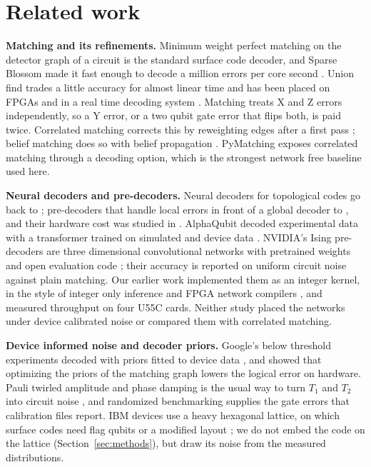 \section{Related work}\label{sec:related}

\textbf{Matching and its refinements.} Minimum weight perfect matching on the detector graph of a circuit
\cite{dennis2002topological,fowler2012surface} is the standard surface code decoder, and Sparse Blossom made it fast
enough to decode a million errors per core second \cite{higgott2025sparse}. Union find trades a little accuracy for
almost linear time \cite{delfosse2021unionfind} and has been placed on FPGAs \cite{liyanage2023fpga} and in a real time
decoding system \cite{barber2025decoder}. Matching treats X and Z errors independently, so a Y error, or a two qubit
gate error that flips both, is paid twice. Correlated matching corrects this by reweighting edges after a first pass
\cite{fowler2013correlated,paler2023pipelined}; belief matching does so with belief propagation
\cite{higgott2023belief}. PyMatching exposes correlated matching through a decoding option, which is the strongest
network free baseline used here.

\textbf{Neural decoders and pre-decoders.} Neural decoders for topological codes go back to
\cite{torlai2017neural}; pre-decoders that handle local errors in front of a global decoder to
\cite{chamberland2018deep}, and their hardware cost was studied in \cite{overwater2022neural}. AlphaQubit decoded
experimental data with a transformer trained on simulated and device data \cite{bausch2024alphaqubit}. NVIDIA's Ising
pre-decoders \cite{chamberland2026predecoder} are three dimensional convolutional networks with pretrained weights
\cite{nvidia_fast_card} and open evaluation code \cite{nvidia_ising_code}; their accuracy is reported on uniform circuit
noise against plain matching. Our earlier work \cite{ali2026nodes} implemented them as an integer kernel, in the style
of integer only inference \cite{jacob2018quantization} and FPGA network compilers
\cite{duarte2018hls4ml,umuroglu2017finn}, and measured throughput on four U55C cards. Neither study placed the
networks under device calibrated noise or compared them with correlated matching.

\textbf{Device informed noise and decoder priors.} Google's below threshold experiments decoded with priors fitted to
device data \cite{google2023scaling,google2025below}, and \cite{sivak2024priors} showed that optimizing the priors of
the matching graph lowers the logical error on hardware. Pauli twirled amplitude and phase damping is the usual way to
turn $T_1$ and $T_2$ into circuit noise \cite{ghosh2012decoherence}, and randomized benchmarking
\cite{magesan2011rb} supplies the gate errors that calibration files report. IBM devices use a heavy hexagonal lattice,
on which surface codes need flag qubits or a modified layout \cite{chamberland2020heavyhex}; we do not embed the code
on the lattice (Section~\ref{sec:methods}), but draw its noise from the measured distributions.
